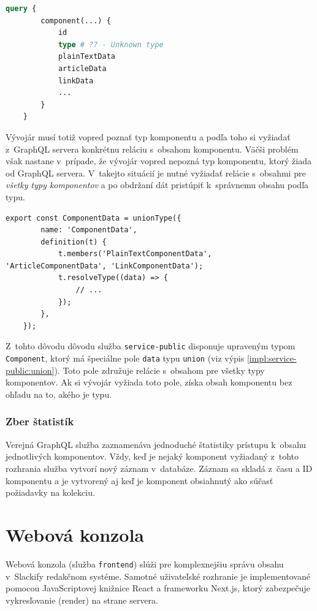 \begin{lstlisting}[language={GraphQL}, caption={Príklad získania obsahu komponentu pred optimalizáciou.}]
	query {
		component(...) {
			id
			type # ?? - Unknown type
			plainTextData
			articleData
			linkData
			...
		}
	}
\end{lstlisting}

\medskip

\noindent Vývojár musí totiž vopred poznať typ komponentu a podľa toho si vyžiadať z~GraphQL servera konkrétnu reláciu s~obsahom komponentu. Väčši problém však nastane v~prípade, že vývojár vopred nepozná typ komponentu, ktorý žiada od GraphQL servera. V~takejto situácií je nutné vyžiadať relácie s~obsahmi pre \emph{všetky typy komponentov} a po obdržaní dát pristúpiť k~správnemu obsahu podľa typu. \\

\begin{lstlisting}[caption={Definícia union typu pre dáta komponentu.}, label={impl:service-public:union}]
	export const ComponentData = unionType({
		name: 'ComponentData',
		definition(t) {
			t.members('PlainTextComponentData', 'ArticleComponentData', 'LinkComponentData');
			t.resolveType((data) => {
				// ...
			});
		},
	});
\end{lstlisting}

\medskip

\noindent Z~tohto dôvodu dôvodu služba \texttt{service-public} disponuje upraveným typom \texttt{Component}, ktorý má špeciálne pole \texttt{data} typu \texttt{union} (viz výpis \ref{impl:service-public:union}). Toto pole združuje relácie s~obsahom pre všetky typy komponentov. Ak si vývojár vyžiada toto pole, získa obsah komponentu bez ohľadu na to, akého je typu.

\subsubsection{Zber štatistík}
Verejná GraphQL služba zaznamenáva jednoduché štatistiky prístupu k~obsahu jednotlivých komponentov. Vždy, keď je nejaký komponent vyžiadaný z~tohto rozhrania služba vytvorí nový záznam v~databáze. Záznam sa skladá z~času a ID komponentu a je vytvorený aj keď je komponent obsiahnutý ako súčasť požiadavky na kolekciu.

\section{Webová konzola}
\label{impl:frontend}
Webová konzola (služba \texttt{frontend}) slúži pre komplexnejšiu správu obsahu v~Slackify redakčnom systéme. Samotné uživateľské rozhranie je implementované pomocou JavaScriptovej knižnice React a frameworku Next.js, ktorý zabezpečuje vykresľovanie (render) na strane servera.


